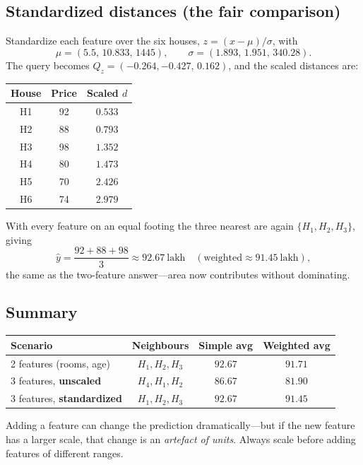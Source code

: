 \documentclass[11pt,a4paper]{report}
\theoremstyle{definition}
\theoremstyle{remark}
\begin{document}
	\subsection*{Standardized distances (the fair comparison)}
	Standardize each feature over the six houses, $z=(x-\mu)/\sigma$, with
	\[
	\mu=(5.5,\,10.833,\,1445),\qquad \sigma=(1.893,\,1.951,\,340.28).
	\]
	The query becomes $Q_z=(-0.264,-0.427,\,0.162)$, and the scaled distances are:
	\begin{center}
		\renewcommand{\arraystretch}{1.2}
		\begin{tabular}{c c c}
			\toprule
			House & Price & Scaled $d$\\
			\midrule
			H1 & 92 & $\mathbf{0.533}$\\
			H2 & 88 & $\mathbf{0.793}$\\
			H3 & 98 & $\mathbf{1.352}$\\
			H4 & 80 & $1.473$\\
			H5 & 70 & $2.426$\\
			H6 & 74 & $2.979$\\
			\bottomrule
		\end{tabular}
	\end{center}
	With every feature on an equal footing the three nearest are again
	$\{H_1,H_2,H_3\}$, giving
	\[
	\hat y=\frac{92+88+98}{3}\approx 92.67\ \text{lakh}\quad(\text{weighted}\approx 91.45\ \text{lakh}),
	\]
	the same as the two-feature answer---area now contributes without dominating.
	
	\subsection*{Summary}
	\begin{center}
		\renewcommand{\arraystretch}{1.2}
		\begin{tabular}{l c c c}
			\toprule
			Scenario & Neighbours & Simple avg & Weighted avg\\
			\midrule
			2 features (rooms, age)      & $H_1,H_2,H_3$ & $92.67$ & $91.71$\\
			3 features, \textbf{unscaled}  & $H_4,H_1,H_2$ & $86.67$ & $81.90$\\
			3 features, \textbf{standardized} & $H_1,H_2,H_3$ & $92.67$ & $91.45$\\
			\bottomrule
		\end{tabular}
	\end{center}
	Adding a feature can change the prediction dramatically---but if the new feature
	has a larger scale, that change is an \emph{artefact of units}. Always scale
	before adding features of different ranges.
	
\end{document}
